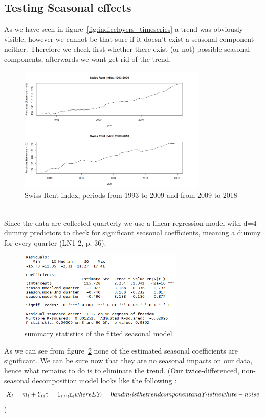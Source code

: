 \documentclass[11pt,a4paper]{article}
\begin{document}
\subsection{Testing Seasonal effects}
As we have seen in figure~\ref{fig:indiceloyers_timeseries} a trend was obviously visible, however we cannot be that sure if it doesn't exist a seasonal component neither. Therefore we check first whether there exist (or not) possible seasonal components, afterwards we want get rid of the trend. 
\begin{figure}[!htb]
\centering
\includegraphics[angle=0,
width=0.8\textwidth]{indiceloyers_test_train}
\caption{Swiss Rent index, periods from 1993 to 2009 and from 2009 to 2018}\label{fig: indiceloyers_test_train}
\end{figure}
\\
Since the data are collected quarterly we use a linear regression model with d=4 dummy predictors to check for significant seasonal coefficients, meaning a dummy for every quarter (LN1-2, p. 36). 
\begin{figure}[!htb]
\centering
\includegraphics[angle=0,
width=0.7\textwidth]{summary_seasonmodel}
\caption{summary statistics of the fitted seasonal model\label{fig:summary_seasonmodel}}
\end{figure}
As we can see from figure~\ref{fig:summary_seasonmodel} none of the estimated seasonal coefficients are significant. We can be sure now that they are no seasonal impacts on our data, hence what remains to do is to eliminate the trend. 
(Our twice-differenced, non-seasonal decomposition model looks like the following \cite[p.~24]{bd02}:
\begin{equation}
X_t = m_t + Y_t, \text{t = 1,...,n,} 
\\where EY_t = 0 and m_t is the trend component and Y_t is the white-noise
\end{equation} )
\end{document}
